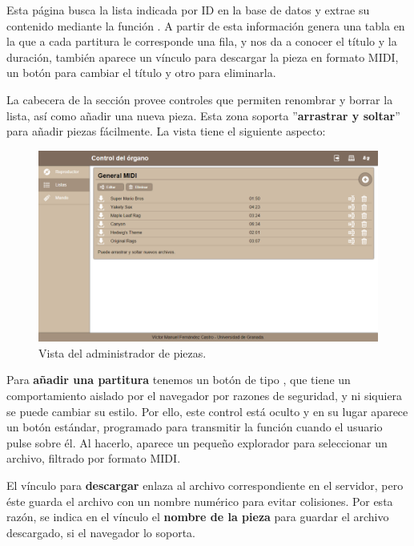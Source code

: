 Esta página busca la lista indicada por ID en la base de datos y extrae su contenido mediante la función . A partir de esta información genera una tabla en la que a cada partitura le corresponde una fila, y nos da a conocer el título y la duración, también aparece un vínculo para descargar la pieza en formato \acrshort{MIDI}, un botón para cambiar el título y otro para eliminarla. 

La cabecera de la sección provee controles que permiten renombrar y borrar la lista, así como añadir una nueva pieza. Esta zona soporta ''\textbf{arrastrar y soltar}'' para añadir piezas fácilmente. La vista tiene el siguiente aspecto:

\smallskip

\begin{figure}[H]
	\noindent \begin{centering}
		\includegraphics[width=\linewidth*2/3]{capitulo5/cap_piezas}
		\par\end{centering}
	\smallskip
	\caption{\label{fig:cap_piezas} Vista del administrador de piezas.}
\end{figure} 

\smallskip

Para \textbf{añadir una partitura} tenemos un botón de tipo , que tiene un comportamiento aislado por el navegador por razones de seguridad, y ni siquiera se puede cambiar su estilo. Por ello, este control está oculto y en su lugar aparece un botón  estándar, programado para transmitir la función  cuando el usuario pulse sobre él. Al hacerlo, aparece un pequeño explorador para seleccionar un archivo, filtrado por formato \acrshort{MIDI}.

El vínculo para \textbf{descargar} enlaza al archivo correspondiente en el servidor, pero éste guarda el archivo con un nombre numérico para evitar colisiones. Por esta razón, se indica en el vínculo el \textbf{nombre de la pieza} para guardar el archivo descargado, si el navegador lo soporta.


